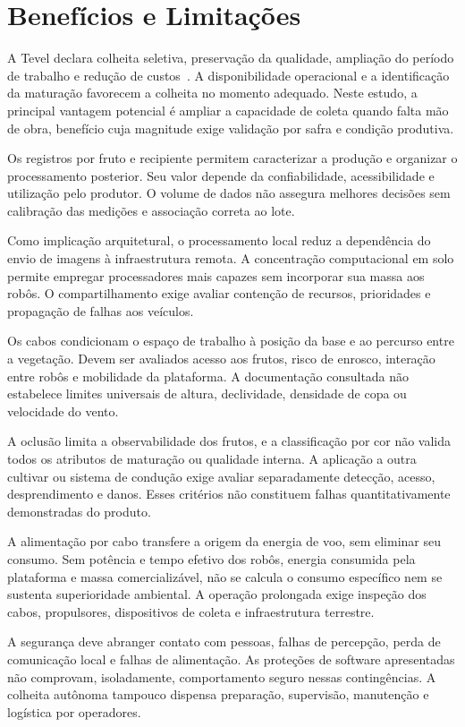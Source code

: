 \section{Benefícios e Limitações}

A Tevel declara colheita seletiva, preservação da qualidade, ampliação do período de trabalho e redução de custos~\cite{tevel2026}. A disponibilidade operacional e a identificação da maturação favorecem a colheita no momento adequado. Neste estudo, a principal vantagem potencial é ampliar a capacidade de coleta quando falta mão de obra, benefício cuja magnitude exige validação por safra e condição produtiva.

Os registros por fruto e recipiente permitem caracterizar a produção e organizar o processamento posterior. Seu valor depende da confiabilidade, acessibilidade e utilização pelo produtor. O volume de dados não assegura melhores decisões sem calibração das medições e associação correta ao lote.

Como implicação arquitetural, o processamento local reduz a dependência do envio de imagens à infraestrutura remota. A concentração computacional em solo permite empregar processadores mais capazes sem incorporar sua massa aos robôs. O compartilhamento exige avaliar contenção de recursos, prioridades e propagação de falhas aos veículos.

Os cabos condicionam o espaço de trabalho à posição da base e ao percurso entre a vegetação. Devem ser avaliados acesso aos frutos, risco de enrosco, interação entre robôs e mobilidade da plataforma. A documentação consultada não estabelece limites universais de altura, declividade, densidade de copa ou velocidade do vento.

A oclusão limita a observabilidade dos frutos, e a classificação por cor não valida todos os atributos de maturação ou qualidade interna. A aplicação a outra cultivar ou sistema de condução exige avaliar separadamente detecção, acesso, desprendimento e danos. Esses critérios não constituem falhas quantitativamente demonstradas do produto.

A alimentação por cabo transfere a origem da energia de voo, sem eliminar seu consumo. Sem potência e tempo efetivo dos robôs, energia consumida pela plataforma e massa comercializável, não se calcula o consumo específico nem se sustenta superioridade ambiental. A operação prolongada exige inspeção dos cabos, propulsores, dispositivos de coleta e infraestrutura terrestre.

A segurança deve abranger contato com pessoas, falhas de percepção, perda de comunicação local e falhas de alimentação. As proteções de software apresentadas não comprovam, isoladamente, comportamento seguro nessas contingências. A colheita autônoma tampouco dispensa preparação, supervisão, manutenção e logística por operadores.

